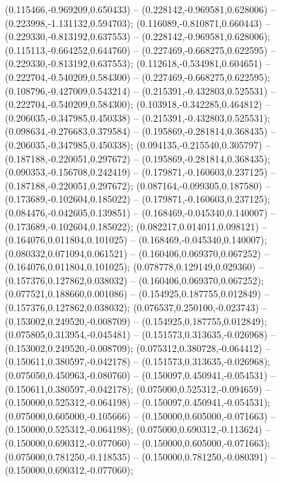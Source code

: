  (0.115466,-0.969209,0.650433) -- (0.228142,-0.969581,0.628006) -- (0.223998,-1.131132,0.594703);
 (0.116089,-0.810871,0.660443) -- (0.229330,-0.813192,0.637553) -- (0.228142,-0.969581,0.628006);
 (0.115113,-0.664252,0.644760) -- (0.227469,-0.668275,0.622595) -- (0.229330,-0.813192,0.637553);
 (0.112618,-0.534981,0.604651) -- (0.222704,-0.540209,0.584300) -- (0.227469,-0.668275,0.622595);
 (0.108796,-0.427009,0.543214) -- (0.215391,-0.432803,0.525531) -- (0.222704,-0.540209,0.584300);
 (0.103918,-0.342285,0.464812) -- (0.206035,-0.347985,0.450338) -- (0.215391,-0.432803,0.525531);
 (0.098634,-0.276683,0.379584) -- (0.195869,-0.281814,0.368435) -- (0.206035,-0.347985,0.450338);
 (0.094135,-0.215540,0.305797) -- (0.187188,-0.220051,0.297672) -- (0.195869,-0.281814,0.368435);
 (0.090353,-0.156708,0.242419) -- (0.179871,-0.160603,0.237125) -- (0.187188,-0.220051,0.297672);
 (0.087164,-0.099305,0.187580) -- (0.173689,-0.102604,0.185022) -- (0.179871,-0.160603,0.237125);
 (0.084476,-0.042605,0.139851) -- (0.168469,-0.045340,0.140007) -- (0.173689,-0.102604,0.185022);
 (0.082217,0.014011,0.098121) -- (0.164076,0.011804,0.101025) -- (0.168469,-0.045340,0.140007);
 (0.080332,0.071094,0.061521) -- (0.160406,0.069370,0.067252) -- (0.164076,0.011804,0.101025);
 (0.078778,0.129149,0.029360) -- (0.157376,0.127862,0.038032) -- (0.160406,0.069370,0.067252);
 (0.077521,0.188660,0.001086) -- (0.154925,0.187755,0.012849) -- (0.157376,0.127862,0.038032);
 (0.076537,0.250100,-0.023743) -- (0.153002,0.249520,-0.008709) -- (0.154925,0.187755,0.012849);
 (0.075805,0.313954,-0.045481) -- (0.151573,0.313635,-0.026968) -- (0.153002,0.249520,-0.008709);
 (0.075312,0.380728,-0.064412) -- (0.150611,0.380597,-0.042178) -- (0.151573,0.313635,-0.026968);
 (0.075050,0.450963,-0.080760) -- (0.150097,0.450941,-0.054531) -- (0.150611,0.380597,-0.042178);
 (0.075000,0.525312,-0.094659) -- (0.150000,0.525312,-0.064198) -- (0.150097,0.450941,-0.054531);
 (0.075000,0.605000,-0.105666) -- (0.150000,0.605000,-0.071663) -- (0.150000,0.525312,-0.064198);
 (0.075000,0.690312,-0.113624) -- (0.150000,0.690312,-0.077060) -- (0.150000,0.605000,-0.071663);
 (0.075000,0.781250,-0.118535) -- (0.150000,0.781250,-0.080391) -- (0.150000,0.690312,-0.077060);
